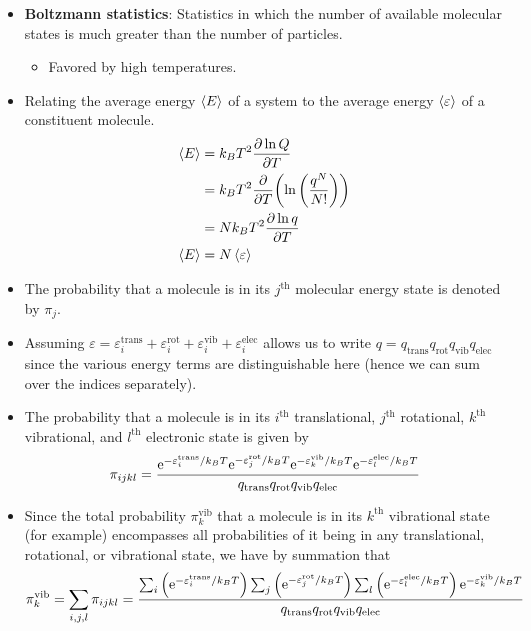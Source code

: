 \documentclass[../notes.tex]{subfiles}
\begin{document}
\begin{itemize}
\begin{itemize}
\begin{itemize}
        \end{itemize}
    \end{itemize}
    \item \textbf{Boltzmann statistics}: Statistics in which the number of available molecular states is much greater than the number of particles.
    \begin{itemize}
        \item Favored by high temperatures.
    \end{itemize}
    \item Relating the average energy $\prb{E}$ of a system to the average energy $\prb{\varepsilon}$ of a constituent molecule.
    \begin{align*}
        \prb{E} &= k_BT^2\pdv{\ln Q}{T}\\
        &= k_BT^2\pdv{T}(\ln\left( \frac{q^N}{N!} \right))\\
        &= Nk_BT^2\pdv{\ln q}{T}\\
        \prb{E} &= N\prb{\varepsilon}
    \end{align*}
    \item The probability that a molecule is in its $j^\text{th}$ molecular energy state is denoted by $\pi_j$.
    \item Assuming $\varepsilon=\varepsilon_i^\text{trans}+\varepsilon_i^\text{rot}+\varepsilon_i^\text{vib}+\varepsilon_i^\text{elec}$ allows us to write $q=q_\text{trans}q_\text{rot}q_\text{vib}q_\text{elec}$ since the various energy terms are distinguishable here (hence we can sum over the indices separately).
    \item The probability that a molecule is in its $i^\text{th}$ translational, $j^\text{th}$ rotational, $k^\text{th}$ vibrational, and $l^\text{th}$ electronic state is given by
    \begin{equation*}
        \pi_{ijkl} = \frac{\e[-\varepsilon_i^\text{trans}/k_BT]\e[-\varepsilon_j^\text{rot}/k_BT]\e[-\varepsilon_k^\text{vib}/k_BT]\e[-\varepsilon_l^\text{elec}/k_BT]}{q_\text{trans}q_\text{rot}q_\text{vib}q_\text{elec}}
    \end{equation*}
    \item Since the total probability $\pi_k^\text{vib}$ that a molecule is in its $k^\text{th}$ vibrational state (for example) encompasses all probabilities of it being in any translational, rotational, or vibrational state, we have by summation that
    \begin{equation*}
        \pi_k^\text{vib} = \sum_{i,j,l}\pi_{ijkl}
        = \frac{\sum_i\left( \e[-\varepsilon_i^\text{trans}/k_BT] \right)\sum_j\left( \e[-\varepsilon_j^\text{rot}/k_BT] \right)\sum_l\left( \e[-\varepsilon_l^\text{elec}/k_BT] \right)\e[-\varepsilon_k^\text{vib}/k_BT]}{q_\text{trans}q_\text{rot}q_\text{vib}q_\text{elec}}

\end{equation*}
\end{itemize}
\end{document}

